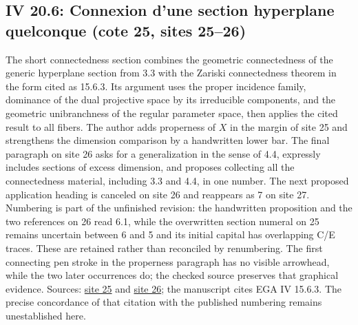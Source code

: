 \documentclass[10pt,a4paper]{article}
\begin{document}
\par{}
\subsection*{IV 20.6: Connexion d'une section hyperplane quelconque (cote 25, sites 25--26)}
The short connectedness section combines the geometric connectedness of the generic hyperplane section from 3.3 with the Zariski connectedness theorem in the form cited as 15.6.3. Its argument uses the proper incidence family, dominance of the dual projective space by its irreducible components, and the geometric unibranchness of the regular parameter space, then applies the cited result to all fibers. The author adds properness of $X$ in the margin of site 25 and strengthens the dimension comparison by a handwritten lower bar. The final paragraph on site 26 asks for a generalization in the sense of 4.4, expressly includes sections of excess dimension, and proposes collecting all the connectedness material, including 3.3 and 4.4, in one number. The next proposed application heading is canceled on site 26 and reappears as 7 on site 27. Numbering is part of the unfinished revision: the handwritten proposition and the two references on 26 read 6.1, while the overwritten section numeral on 25 remains uncertain between 6 and 5 and its initial capital has overlapping C/E traces. These are retained rather than reconciled by renumbering. The first connecting pen stroke in the properness paragraph has no visible arrowhead, while the two later occurrences do; the checked source preserves that graphical evidence. Sources: \href{https://grothendieck.umontpellier.fr/web/viewer.html?file=../25.pdf\#page=26}{site 25} and \href{https://grothendieck.umontpellier.fr/web/viewer.html?file=../25.pdf\#page=27}{site 26}; the manuscript cites EGA IV 15.6.3. The precise concordance of that citation with the published numbering remains unestablished here.
\par{}

\par{}
\end{document}
